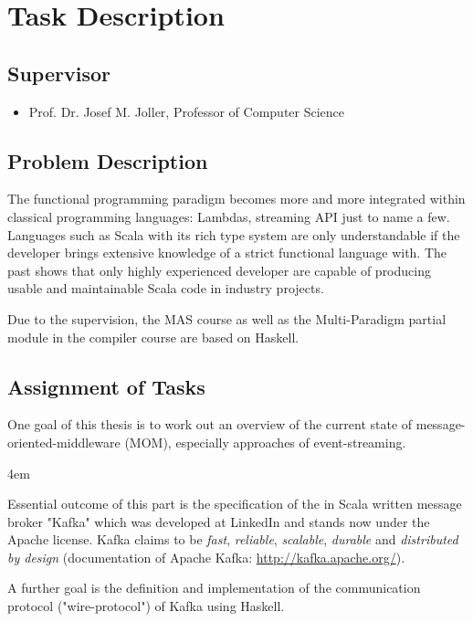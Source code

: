 \chapter{Task Description}
\section*{Supervisor}
\begin{itemize}
    \item Prof. Dr. Josef M. Joller, Professor of Computer Science
\end{itemize}

\section*{Problem Description}

The functional programming paradigm becomes more and more integrated within classical
programming languages: Lambdas, streaming API just to name a few. Languages such
as Scala with its rich type system are only understandable if the developer
brings extensive knowledge of a strict functional language with. The past shows
that only highly experienced developer are capable of producing usable and
maintainable Scala code in industry projects.

Due to the supervision, the MAS course as well as the Multi-Paradigm partial
module in the compiler course are based on Haskell.

\section*{Assignment of Tasks}

One goal of this thesis is to work out an overview of the current state of
message-oriented-middleware (MOM), especially approaches of event-streaming.

\par
\begingroup
\leftskip4em
\rightskip\leftskip

Essential outcome of this part is the specification of the in Scala written
message broker "Kafka" which was developed at LinkedIn and stands now under the
Apache license.  Kafka claims to be \textit{fast}, \textit{reliable},
\textit{scalable}, \textit{durable} and \textit{distributed by design}
(documentation of Apache Kafka: \url{http://kafka.apache.org/}).

\par
\endgroup

A further goal is the definition and implementation of the communication
protocol ("wire-protocol") of Kafka using Haskell.

